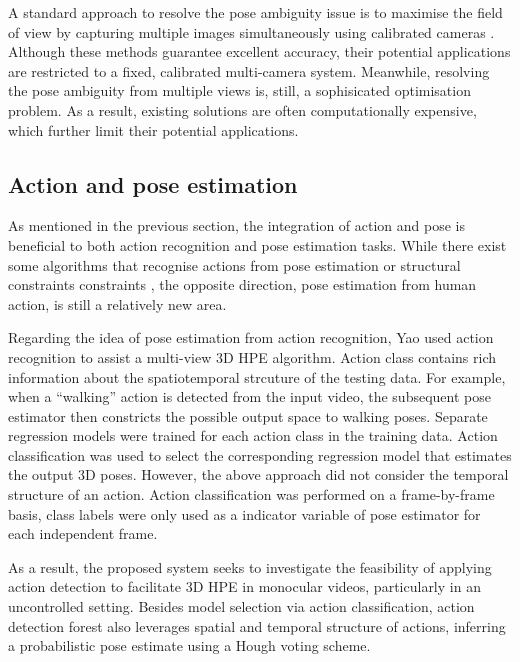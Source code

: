 A standard approach to resolve the pose ambiguity issue is to maximise the field of view by capturing multiple images simultaneously using calibrated cameras \cite{Pons-Moll2011, Sigal2012, Yao2012}.   
Although these methods guarantee excellent accuracy, their potential applications are restricted to a fixed, calibrated multi-camera system. 
Meanwhile, resolving the pose ambiguity from multiple views is, still, a sophisicated optimisation problem. 
As a result, existing solutions are often computationally expensive, which further limit their potential applications.   

\subsection{Action and pose estimation}

As mentioned in the previous section, the integration of action and pose is beneficial to both action recognition and pose estimation tasks. 
While there exist some algorithms that recognise actions from pose estimation or structural constraints constraints \cite{Yu2010, Raja2011}, the opposite direction, \ie pose estimation from human action, is still a relatively new area. 

Regarding the idea of pose estimation from action recognition, Yao \etal \cite{Yao2012} used action recognition to assist a multi-view 3D HPE algorithm. 
Action class contains rich information about the spatiotemporal strcuture of the testing data. For example, when a ``walking'' action is detected from the input video, the subsequent pose estimator then constricts the possible output space to walking poses.   
Separate regression models were trained for each action class in the training data. 
Action classification was used to select the corresponding regression model that estimates the output 3D poses. 
However, the above approach did not consider the temporal structure of an action.    
Action classification was performed on a frame-by-frame basis, class labels were only used as a indicator variable of pose estimator for each independent frame. 

As a result, the proposed system seeks to investigate the feasibility of applying action detection to facilitate 3D HPE in monocular videos, particularly in an uncontrolled setting. 
Besides model selection via action classification, action detection forest also leverages spatial and temporal structure of actions, inferring a probabilistic pose estimate using a Hough voting scheme.  

